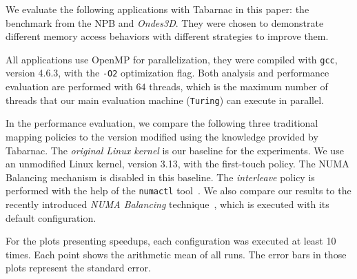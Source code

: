 We evaluate the following applications with \gls{Tabarnac} in this paper: the \IS benchmark from the \gls{NPB} and \emph{Ondes3D}.
They were chosen to demonstrate different memory access behaviors with different strategies to improve them.

All applications use OpenMP for parallelization, they were compiled with \texttt{gcc}, version 4.6.3, with the \texttt{-O2} optimization flag.
Both analysis and performance evaluation are performed with $64$ threads, which is the maximum number of threads that our main evaluation machine (\texttt{Turing}) can execute in parallel.

In the performance evaluation, we compare the following three traditional mapping policies to the version modified using the knowledge provided by \gls{Tabarnac}.
The \emph{original Linux kernel} is our baseline for the experiments. We use an unmodified Linux kernel, version 3.13, with the first-touch policy.
The NUMA Balancing mechanism is disabled in this baseline.
The \emph{interleave} policy is performed with the help of the \texttt{numactl} tool~\cite{Kleen05NUMA}.
We also compare our results to the recently introduced \emph{NUMA Balancing} technique~\cite{Corbet12Toward}, which is executed with its default configuration.

For the plots presenting speedups, each configuration was executed at least 10 times. Each point shows the arithmetic mean of all runs.
The error bars in those plots represent the standard error.


